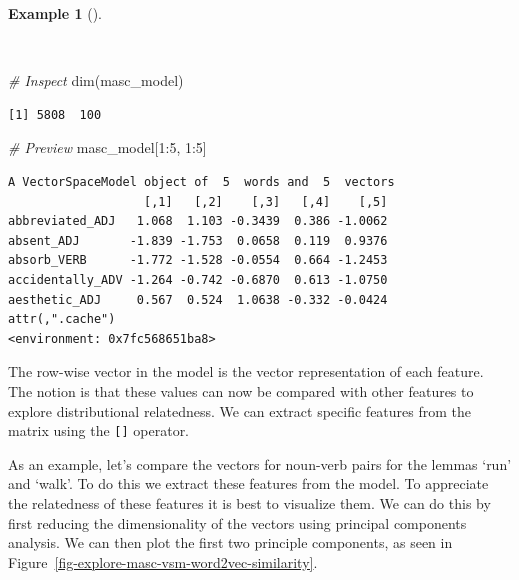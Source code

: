 \documentclass[
  letterpaper,
]{latex/krantz}
\newenvironment{Shaded}{\begin{snugshade}}{\end{snugshade}}
\newcommand{\CommentTok}[1]{\textcolor[rgb]{0.00,0.00,0.00}{\textit{#1}}}
\newcommand{\DecValTok}[1]{\textcolor[rgb]{0.00,0.00,0.00}{#1}}
\newcommand{\FunctionTok}[1]{\textcolor[rgb]{0.00,0.00,0.00}{#1}}
\newcommand{\NormalTok}[1]{\textcolor[rgb]{0.00,0.00,0.00}{#1}}
\newcommand{\SpecialCharTok}[1]{\textcolor[rgb]{0.00,0.00,0.00}{#1}}
\theoremstyle{definition}
\newtheorem{example}{Example}[chapter]
\theoremstyle{remark}
\begin{document}
\begin{example}[]\protect\hypertarget{exm-explore-masc-vsm-word2vec-vector-object}{}\label{exm-explore-masc-vsm-word2vec-vector-object}

~

\begin{Shaded}
\begin{Highlighting}[]
\CommentTok{\# Inspect}
\FunctionTok{dim}\NormalTok{(masc\_model)}
\end{Highlighting}
\end{Shaded}

\begin{verbatim}
[1] 5808  100
\end{verbatim}

\begin{Shaded}
\begin{Highlighting}[]
\CommentTok{\# Preview}
\NormalTok{masc\_model[}\DecValTok{1}\SpecialCharTok{:}\DecValTok{5}\NormalTok{, }\DecValTok{1}\SpecialCharTok{:}\DecValTok{5}\NormalTok{]}
\end{Highlighting}
\end{Shaded}

\begin{verbatim}
A VectorSpaceModel object of  5  words and  5  vectors
                   [,1]   [,2]    [,3]   [,4]    [,5]
abbreviated_ADJ   1.068  1.103 -0.3439  0.386 -1.0062
absent_ADJ       -1.839 -1.753  0.0658  0.119  0.9376
absorb_VERB      -1.772 -1.528 -0.0554  0.664 -1.2453
accidentally_ADV -1.264 -0.742 -0.6870  0.613 -1.0750
aesthetic_ADJ     0.567  0.524  1.0638 -0.332 -0.0424
attr(,".cache")
<environment: 0x7fc568651ba8>
\end{verbatim}

\end{example}

The row-wise vector in the model is the vector representation of each
feature. The notion is that these values can now be compared with other
features to explore distributional relatedness. We can extract specific
features from the matrix using the \texttt{{[}{]}} operator.

As an example, let's compare the vectors for noun-verb pairs for the
lemmas `run' and `walk'. To do this we extract these features from the
model. To appreciate the relatedness of these features it is best to
visualize them. We can do this by first reducing the dimensionality of
the vectors using principal components analysis. We can then plot the
first two principle components, as seen in
Figure~\ref{fig-explore-masc-vsm-word2vec-similarity}.
\end{document}
